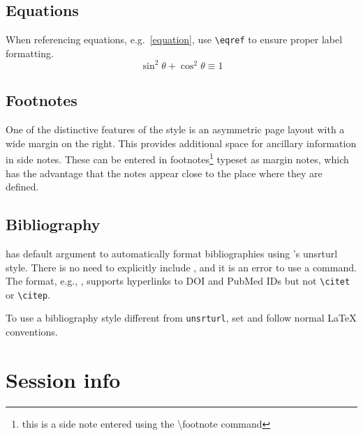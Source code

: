 \documentclass{article}
\begin{document}
\subsection{Equations}

When referencing equations, e.g.~\eqref{equation}, use \verb+\eqref+ to ensure proper label formatting.
%
\begin{equation}\label{equation}
  \sin^2 \theta + \cos^2 \theta \equiv 1
\end{equation}

\subsection{Footnotes}

One of the distinctive features of the style is an asymmetric page layout 
with a wide margin on the right. This provides additional space for ancillary information in side notes. These can be entered in footnotes\footnote{this is a side note entered using the {\ttfamily \textbackslash footnote} command} typeset as margin notes, which has the advantage that the notes appear close to the place where they are defined. 

\subsection{Bibliography}

 has default argument
 to automatically format bibliographies using
's unsrturl style. There is no need to explicitly
include , and it is an error to use a
\verb++ command. The  format,
e.g., \cite{Leisch2002, Xie2014}, supports
hyperlinks to DOI and PubMed IDs but not \verb+\citet+ or
\verb+\citep+.

To use a bibliography style different from \verb+unsrturl+, set
 and follow normal \LaTeX{} conventions.




\newpage

\appendix

\section{Session info}
\end{document}
